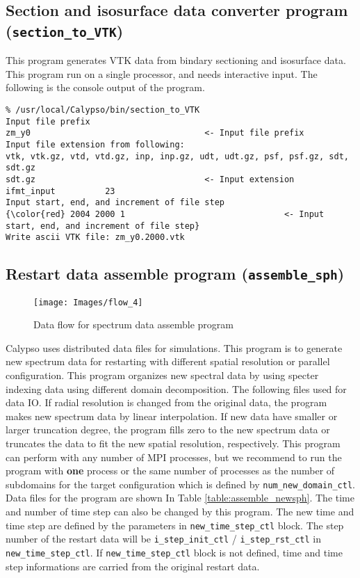 \subsection{Section and isosurface data converter program ({\tt section\_to\_VTK})} 
\label{section:section_to_VTK}
This program generates VTK data from bindary sectioning and isosurface data. This program run on a single processor, and needs interactive input. The following is the console output of the program.

{\small
\begin{verbatim}
% /usr/local/Calypso/bin/section_to_VTK
Input file prefix
zm_y0									<- Input file prefix
Input file extension from following:
vtk, vtk.gz, vtd, vtd.gz, inp, inp.gz, udt, udt.gz, psf, psf.gz, sdt, sdt.gz  
sdt.gz									<- Input extension
ifmt_input          23
Input start, end, and increment of file step
{\color{red} 2004 2000 1								<- Input start, end, and increment of file step} 
Write ascii VTK file: zm_y0.2000.vtk
\end{verbatim}
}

\subsection{Restart data assemble program ({\tt assemble\_sph})}
\label{section:assemble_sph}
%
\begin{figure}[htbp]
\begin{center}
\texttt{[image: Images/flow\_4]}
\end{center}
\caption{Data flow for spectrum data assemble program}
\label{fig:flow_4}
\end{figure}
%
Calypso uses distributed data files for simulations. This program is to generate new spectrum data for restarting with different spatial resolution or parallel configuration. This program organizes new spectral data by using specter indexing data using different domain decomposition. The following files used for data IO. If radial resolution is changed from the original data, the program makes new spectrum data by linear interpolation. If new data have smaller or larger truncation degree, the program fills zero to the new spectrum data or truncates the data to fit the new spatial resolution, respectively. This program can perform with any number of MPI processes, but we recommend to run the program with {\bf one} process or the same number of processes as the number of subdomains for the target configuration which is defined by \verb|num_new_domain_ctl|. Data files for the program are shown In Table \ref{table:assemble_newsph}. The time and number of time step can also be changed by this program. The new time and time step are defined by the parameters in \verb|new_time_step_ctl| block. The step number of the restart data will be \verb|i_step_init_ctl| / \verb|i_step_rst_ctl| in  \verb|new_time_step_ctl|. If \verb|new_time_step_ctl| block is not defined, time and time step informations are carried from the original restart data.

